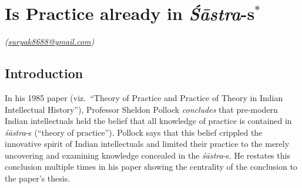 \chapter{Is Practice already in {{\sl\bfseries Śāstra}\relax}-s$^{*}$}\label{chapter\thechapter:begin}
\vskip -10pt



\hfill{\sl(\url{suryak8688@ymail.com})}

\vskip -10pt


\section*{Introduction}

In his 1985 paper (viz.\ ``Theory of Practice and Practice of Theory in Indian Intellectual History''), Professor Sheldon Pollock {\sl concludes} that pre-modern Indian intellectuals held the belief that all knowledge of practice is contained in {\sl śāstra}-s (``theory  of practice'').  Pollock says that this belief crippled the innovative spirit of Indian intellectuals and limited their practice to the merely uncovering and examining knowledge concealed in the {\sl śāstra}-s. He restates this conclusion multiple times in his paper showing the centrality of the conclusion to the paper's thesis. 

